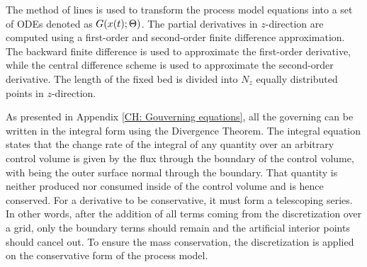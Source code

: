 \documentclass[../Article_Sensitivity_Analsysis.tex]{subfiles}
\begin{document}
			The method of lines is used to transform the process model equations into a set of ODEs denoted as ${\color{black}G}({\color{black}x}(t);{\color{black}\Theta})$. The partial derivatives in $z$-direction are computed using a first-order and second-order finite difference approximation. The backward finite difference is used to approximate the first-order derivative, while the central difference scheme is used to approximate the second-order derivative. The length of the fixed bed is divided into $N_z$ equally distributed points in $z$-direction. 
			
			As presented in Appendix \ref{CH: Gouverning equations}, all the governing can be written in the integral form using the Divergence Theorem. The integral equation states that the change rate of the integral of any quantity over an arbitrary control volume is given by the flux through the boundary of the control volume, with being the outer surface normal through the boundary. That quantity is neither produced nor consumed inside of the control volume and is hence conserved. For a derivative to be conservative, it must form a telescoping series. In other words, after the addition of all terms coming from the discretization over a grid, only the boundary terms should remain and the artificial interior points should cancel out. To ensure the mass conservation, the discretization is applied on the conservative form of the process model.
			
%			
%			
			
\end{document}
